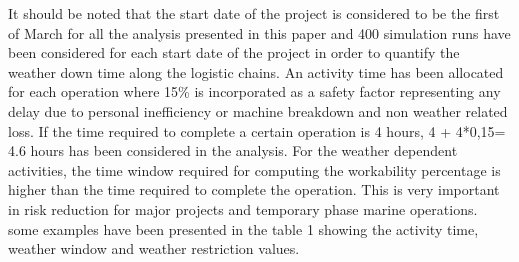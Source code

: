 It should be noted that the start date of the project is considered to be the first of March for all the analysis presented in this paper and 400 simulation runs have been considered for each start date of the project in order to quantify the weather down time along the logistic chains. An activity time has been allocated for each operation where 15\%  is incorporated as a safety factor representing any delay due to personal inefficiency or machine breakdown and non weather related loss. If the time required to complete a certain operation is 4 hours, 4 + 4*0,15= 4.6 hours has been considered in the analysis. For the weather dependent activities, the time window required for computing the workability percentage is higher than the time required to complete the operation. This is very important  in risk reduction for major projects and temporary phase marine operations. some examples have been presented in the table 1 showing the activity time, weather window and weather restriction values. 

